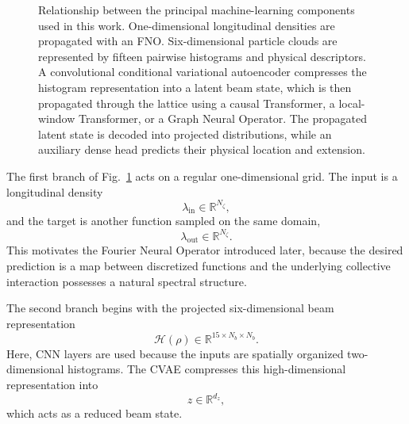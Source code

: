 \begin{figure}[h!]
{%
    }
    \caption{
        Relationship between the principal machine-learning components used in
        this work. One-dimensional longitudinal densities are propagated with an
        FNO. Six-dimensional particle clouds are represented by fifteen pairwise
        histograms and physical descriptors. A convolutional conditional
        variational autoencoder compresses the histogram representation into a
        latent beam state, which is then propagated through the lattice using a
        causal Transformer, a local-window Transformer, or a Graph Neural
        Operator. The propagated latent state is decoded into projected
        distributions, while an auxiliary dense head predicts their physical
        location and extension.
    }
    \label{fig:ml_architecture_overview}
\end{figure}

The first branch of Fig.~\ref{fig:ml_architecture_overview} acts on a regular one-dimensional grid. The input is a longitudinal density
\begin{equation}
    \lambda_{\mathrm{in}}
    \in
    \mathbb{R}^{N_{\zeta}},
\end{equation}
and the target is another function sampled on the same domain,
\begin{equation}
    \lambda_{\mathrm{out}}
    \in
    \mathbb{R}^{N_{\zeta}}.
\end{equation}
This motivates the Fourier Neural Operator introduced later, because the desired prediction is a map between discretized functions and the underlying collective interaction possesses a natural spectral structure.

The second branch begins with the projected six-dimensional beam representation
\begin{equation}
    \mathcal{H}(\rho)
    \in
    \mathbb{R}^{15\times N_b\times N_b}.
\end{equation}
Here, CNN layers are used because the inputs are spatially organized two-dimensional histograms. The CVAE compresses this high-dimensional representation into
\begin{equation}
    z
    \in
    \mathbb{R}^{d_z},
\end{equation}
which acts as a reduced beam state.

